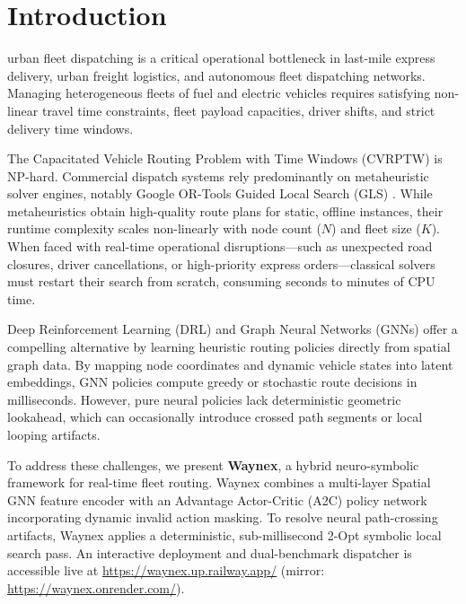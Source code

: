 \documentclass[10pt,journal,compsoc]{IEEEtran}
\begin{document}
\section{Introduction}
 urban fleet dispatching is a critical operational bottleneck in last-mile express delivery, urban freight logistics, and autonomous fleet dispatching networks. Managing heterogeneous fleets of fuel and electric vehicles requires satisfying non-linear travel time constraints, fleet payload capacities, driver shifts, and strict delivery time windows.

The Capacitated Vehicle Routing Problem with Time Windows (CVRPTW) is NP-hard. Commercial dispatch systems rely predominantly on metaheuristic solver engines, notably Google OR-Tools Guided Local Search (GLS) \cite{ortools}. While metaheuristics obtain high-quality route plans for static, offline instances, their runtime complexity scales non-linearly with node count ($N$) and fleet size ($K$). When faced with real-time operational disruptions—such as unexpected road closures, driver cancellations, or high-priority express orders—classical solvers must restart their search from scratch, consuming seconds to minutes of CPU time.

Deep Reinforcement Learning (DRL) and Graph Neural Networks (GNNs) offer a compelling alternative by learning heuristic routing policies directly from spatial graph data. By mapping node coordinates and dynamic vehicle states into latent embeddings, GNN policies compute greedy or stochastic route decisions in milliseconds. However, pure neural policies lack deterministic geometric lookahead, which can occasionally introduce crossed path segments or local looping artifacts.

To address these challenges, we present \textbf{Waynex}, a hybrid neuro-symbolic framework for real-time fleet routing. Waynex combines a multi-layer Spatial GNN feature encoder with an Advantage Actor-Critic (A2C) policy network incorporating dynamic invalid action masking. To resolve neural path-crossing artifacts, Waynex applies a deterministic, sub-millisecond 2-Opt symbolic local search pass. An interactive deployment and dual-benchmark dispatcher is accessible live at \url{https://waynex.up.railway.app/} (mirror: \url{https://waynex.onrender.com/}).
\end{document}
